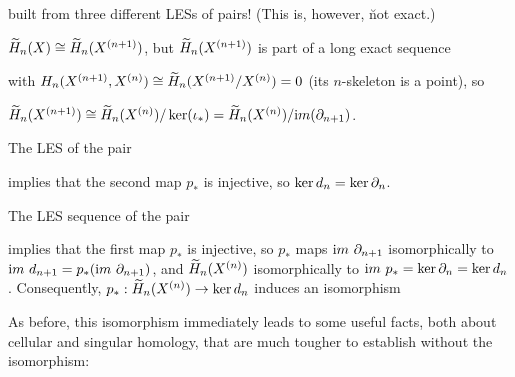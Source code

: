 \ssk

built from three different LESs of pairs! (This is, however, \u{not} exact.)

\ssk

$\widetilde{H}_n(X)\cong \widetilde{H}_n(X^{(n+1)})$, but $\widetilde{H}_n(X^{(n+1)})$ is part of a long exact sequence

\ssk



\ssk

with $H_{n}(X^{(n+1)},X^{(n)})\cong \widetilde{H}_{n}(X^{(n+1)}/X^{(n)})=0$ (its $n$-skeleton is a point),
so 

\ssk

$\widetilde{H}_n(X^{(n+1)})\cong \widetilde{H}_{n}(X^{(n)})/\ker(\iota_*)=
\widetilde{H}_{n}(X^{(n)})/{\text im}(\partial_{n+1})$. 

\ssk

The LES of the pair

\ssk


\ssk

implies that the second map $p_*$ is injective, so $\ker d_n=\ker \partial_n$. 

The LES sequence of the pair

\ssk


\ssk

implies that the first map $p_*$ is injective, so $p_*$ maps ${\text im}\ \partial_{n+1}$
isomorphically to ${\text im}\ d_{n+1}= p_*({\text im}\ \partial_{n+1})$, and $\widetilde{H}_n(X^{(n)})$
isomorphically to ${\text im}\ p_*=\ker\partial_n=\ker d_n$. Consequently, $p_*:\widetilde{H}_n(X^{(n)})\rightarrow \ker d_n$ induces an isomorphism

\ssk


\vfill
\eject

As before, this isomorphism immediately leads to some useful facts, both about cellular and singular
homology, that are much tougher to establish without the isomorphism:

